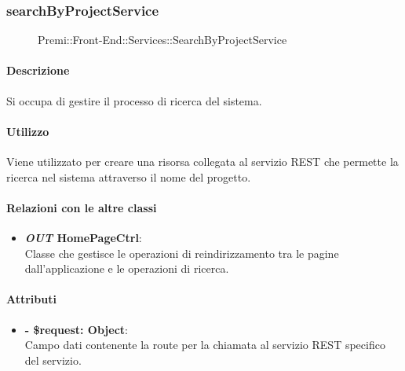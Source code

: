 \subsubsection{searchByProjectService}
	\begin{figure}[h]
		\centering
		\caption[Premi::Front-End::Services::SearchByProjectService]{Premi::Front-End::Services::SearchByProjectService}
	\end{figure}
	
	\paragraph{Descrizione}
	Si occupa di gestire il processo di ricerca del sistema.
	
	\paragraph{Utilizzo}
	Viene utilizzato per creare una risorsa collegata al servizio REST che permette la ricerca nel sistema attraverso il nome del progetto.
	
	\paragraph{Relazioni con le altre classi}
	\begin{itemize}
		\item \textbf{\textit{OUT} HomePageCtrl}:\\
		Classe che gestisce le operazioni di reindirizzamento tra le pagine dall'applicazione e le operazioni di ricerca.
	\end{itemize}
	
	\paragraph{Attributi}
	\begin{itemize}
		\item \textbf{- \$request: Object}:\\
		Campo dati contenente la route per la chiamata al servizio REST specifico del servizio.
	\end{itemize}	
	
